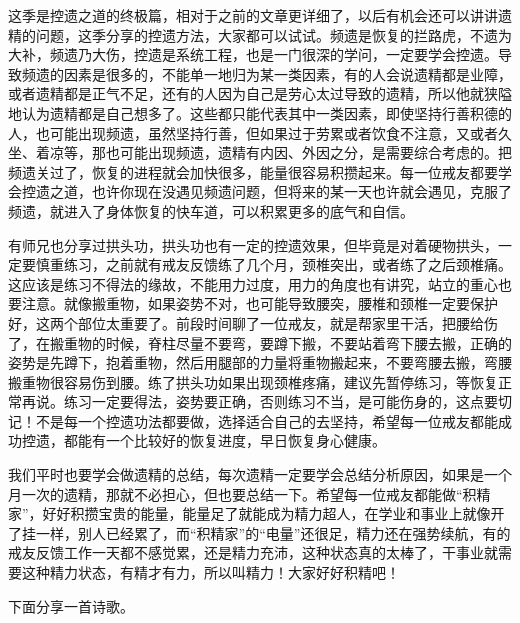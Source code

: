 这季是控遗之道的终极篇，相对于之前的文章更详细了，以后有机会还可以讲讲遗精的问题，这季分享的控遗方法，大家都可以试试。频遗是恢复的拦路虎，不遗为大补，频遗乃大伤，控遗是系统工程，也是一门很深的学问，一定要学会控遗。导致频遗的因素是很多的，不能单一地归为某一类因素，有的人会说遗精都是业障，或者遗精都是正气不足，还有的人因为自己是劳心太过导致的遗精，所以他就狭隘地认为遗精都是自己想多了。这些都只能代表其中一类因素，即使坚持行善积德的人，也可能出现频遗，虽然坚持行善，但如果过于劳累或者饮食不注意，又或者久坐、着凉等，那也可能出现频遗，遗精有内因、外因之分，是需要综合考虑的。把频遗关过了，恢复的进程就会加快很多，能量很容易积攒起来。每一位戒友都要学会控遗之道，也许你现在没遇见频遗问题，但将来的某一天也许就会遇见，克服了频遗，就进入了身体恢复的快车道，可以积累更多的底气和自信。

有师兄也分享过拱头功，拱头功也有一定的控遗效果，但毕竟是对着硬物拱头，一定要慎重练习，之前就有戒友反馈练了几个月，颈椎突出，或者练了之后颈椎痛。这应该是练习不得法的缘故，不能用力过度，用力的角度也有讲究，站立的重心也要注意。就像搬重物，如果姿势不对，也可能导致腰突，腰椎和颈椎一定要保护好，这两个部位太重要了。前段时间聊了一位戒友，就是帮家里干活，把腰给伤了，在搬重物的时候，脊柱尽量不要弯，要蹲下搬，不要站着弯下腰去搬，正确的姿势是先蹲下，抱着重物，然后用腿部的力量将重物搬起来，不要弯腰去搬，弯腰搬重物很容易伤到腰。练了拱头功如果出现颈椎疼痛，建议先暂停练习，等恢复正常再说。练习一定要得法，姿势要正确，否则练习不当，是可能伤身的，这点要切记！不是每一个控遗功法都要做，选择适合自己的去坚持，希望每一位戒友都能成功控遗，都能有一个比较好的恢复进度，早日恢复身心健康。

我们平时也要学会做遗精的总结，每次遗精一定要学会总结分析原因，如果是一个月一次的遗精，那就不必担心，但也要总结一下。希望每一位戒友都能做“积精家”，好好积攒宝贵的能量，能量足了就能成为精力超人，在学业和事业上就像开了挂一样，别人已经累了，而“积精家”的“电量”还很足，精力还在强势续航，有的戒友反馈工作一天都不感觉累，还是精力充沛，这种状态真的太棒了，干事业就需要这种精力状态，有精才有力，所以叫精力！大家好好积精吧！

下面分享一首诗歌。

